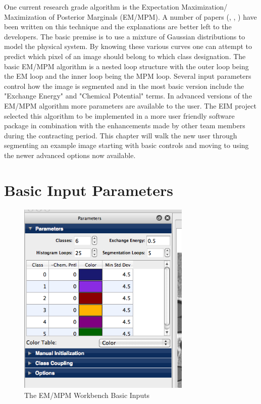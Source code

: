 \documentclass[12pt,oneside]{book}
\begin{document}
One current research grade algorithm is the Expectation Maximization/ Maximization of Posterior Marginals (EM/MPM). A number of papers (\cite{1}, \cite{2}, \cite{3}) have been written on this technique and the explanations are better left to the developers. The basic premise is to use a mixture of Gaussian distributions to model the physical system. By knowing these various curves one can attempt to predict which pixel of an image should belong to which class designation. The basic EM/MPM algorithm is a nested loop structure with the outer loop being the EM loop and the inner loop being the MPM loop. Several input parameters control how the image is segmented and in the most basic version include the "Exchange Energy" and "Chemical Potential" terms. In advanced versions of the EM/MPM algorithm more parameters are available to the user. The EIM project selected this algorithm to be implemented in a more user friendly software package in combination with the enhancements made by other team members during the contracting period. This chapter will walk the new user through segmenting an example image starting with basic controls and moving to using the newer advanced options now available.

\section{Basic Input Parameters}

\begin{figure}[htbp]
\begin{center}
\includegraphics[width=3.25in]{images/Untitled3.png}
\caption{The EM/MPM Workbench Basic Inputs}
\label{image3}
\end{center}
\end{figure}
\end{document}
